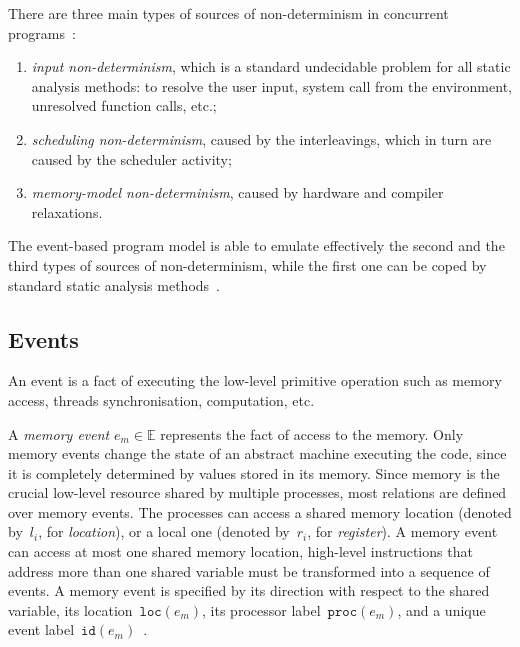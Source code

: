 There are three main types of sources of non-determinism in concurrent programs~\cite{musuvathi2008fair}:
\begin{enumerate}[noitemsep,topsep=0pt]
\item \textit{input non-determinism}, which is a standard undecidable problem for all static analysis methods: to resolve the user input, system call from the environment, unresolved function calls, etc.;
\item \textit{scheduling non-determinism}, caused by the interleavings, which in turn are caused by the scheduler activity;
\item \textit{memory-model non-determinism}, caused by hardware and compiler relaxations.
\end{enumerate}

The event-based program model is able to emulate effectively the second and the third types of sources of non-determinism, while the first one can be coped by standard static analysis methods~\cite{landi1992undecidability,SurveySymExec-CSUR18}.



\subsection{Events}
\label{ch:wmm:model:events}

An event is a fact of executing the low-level primitive operation such as memory access, threads synchronisation, computation, etc.

A \textit{memory event} $e_m \in \mathbb{E}$ represents the fact of access to the memory.
Only memory events change the state of an abstract machine executing the code, since it is completely determined by values stored in its memory.
Since memory is the crucial low-level resource shared by multiple processes, most relations are defined over memory events. 
The processes can access a shared memory location (denoted by~$l_i$, for \textit{location}), or a local one (denoted by~$r_i$, for \textit{register}).
A memory event can access at most one shared memory location, high-level instructions that address more than one shared variable must be transformed into a sequence of events.
A memory event is specified by its direction with respect to the shared variable, its location~$\mathtt{loc}(e_m)$, its processor label~$\mathtt{proc}(e_m)$, and a unique event label~$\mathtt{id}(e_m)$~\cite{alglave2010shared}.

